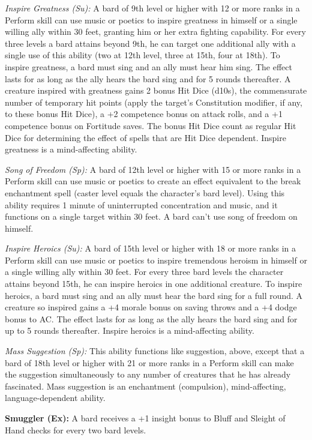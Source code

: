 \textit{Inspire Greatness (Su):} A bard of 9th level or higher with 12 or more ranks in a Perform skill can use music or poetics to inspire greatness in himself or a single willing ally within 30 feet, granting him or her extra fighting capability. For every three levels a bard attains beyond 9th, he can target one additional ally with a single use of this ability (two at 12th level, three at 15th, four at 18th). To inspire greatness, a bard must sing and an ally must hear him sing. The effect lasts for as long as the ally hears the bard sing and for 5 rounds thereafter. A creature inspired with greatness gains 2 bonus Hit Dice (d10s), the commensurate number of temporary hit points (apply the target's Constitution modifier, if any, to these bonus Hit Dice), a +2 competence bonus on attack rolls, and a +1 competence bonus on Fortitude saves. The bonus Hit Dice count as regular Hit Dice for determining the effect of spells that are Hit Dice dependent. Inspire greatness is a mind-affecting ability.

\textit{Song of Freedom (Sp):} A bard of 12th level or higher with 15 or more ranks in a Perform skill can use music or poetics to create an effect equivalent to the break enchantment spell (caster level equals the character's bard level). Using this ability requires 1 minute of uninterrupted concentration and music, and it functions on a single target within 30 feet. A bard can't use song of freedom on himself.

\textit{Inspire Heroics (Su):} A bard of 15th level or higher with 18 or more ranks in a Perform skill can use music or poetics to inspire tremendous heroism in himself or a single willing ally within 30 feet. For every three bard levels the character attains beyond 15th, he can inspire heroics in one additional creature. To inspire heroics, a bard must sing and an ally must hear the bard sing for a full round. A creature so inspired gains a +4 morale bonus on saving throws and a +4 dodge bonus to AC. The effect lasts for as long as the ally hears the bard sing and for up to 5 rounds thereafter. Inspire heroics is a mind-affecting ability.

\textit{Mass Suggestion (Sp):} This ability functions like suggestion, above, except that a bard of 18th level or higher with 21 or more ranks in a Perform skill can make the suggestion simultaneously to any number of creatures that he has already fascinated. Mass suggestion is an enchantment (compulsion), mind-affecting, language-dependent ability.

\textbf{Smuggler (Ex):} A bard receives a +1 insight bonus to Bluff and Sleight of Hand checks for every two bard levels.

